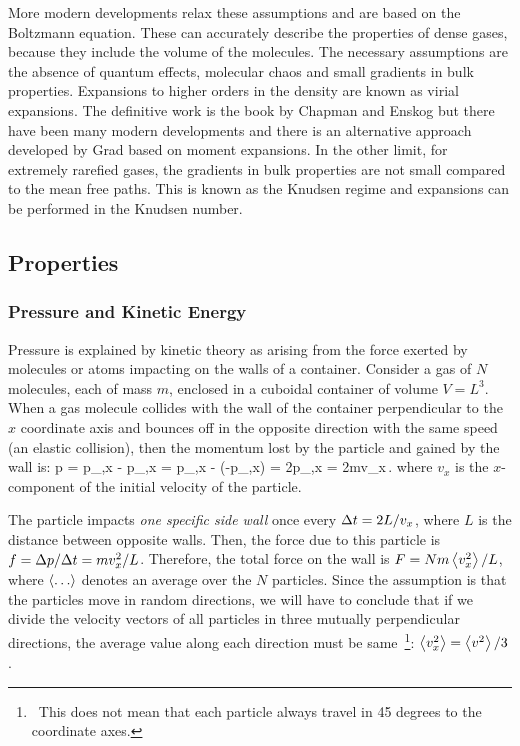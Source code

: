 More modern developments relax these assumptions and are based on the Boltzmann equation. These can accurately describe the properties of dense gases, because they include the volume of the molecules. The necessary assumptions are the absence of quantum effects, molecular chaos and small gradients in bulk properties. Expansions to higher orders in the density are known as virial expansions. The definitive work is the book by Chapman and Enskog but there have been many modern developments and there is an alternative approach developed by Grad based on moment expansions. In the other limit, for extremely rarefied gases, the gradients in bulk properties are not small compared to the mean free paths. This is known as the Knudsen regime and expansions can be performed in the Knudsen number.


\subsection{Properties}


\subsubsection{Pressure and Kinetic Energy}
Pressure is explained by kinetic theory as arising from the force exerted by molecules or atoms impacting on the walls of a container. Consider a gas of $N$ molecules, each of mass $m$, enclosed in a cuboidal container of volume $V = L^3$. When a gas molecule collides with the wall of the container perpendicular to the $x$ coordinate axis and bounces off in the opposite direction with the same speed (an elastic collision), then the momentum lost by the particle and gained by the wall is:
\beq
\diff p = p_{,x} - p_{,x} = p_{,x} - (-p_{,x}) = 2p_{,x} = 2mv_x\,.
\eeq
where $v_x$ is the $x$-component of the initial velocity of the particle. 

The particle impacts \emph{one specific side wall} once every $\Delta t = 2L/v_x$, where $L$ is the distance between opposite walls. Then, the force due to this particle is $f = \Delta p/\Delta t = mv_x^2/L$. Therefore, the total force on the wall is $F = Nm\left\langle{v_x^2}\right\rangle/L$, where $\left\langle{\dots}\right\rangle$ denotes an average over the $N$ particles. Since the assumption is that the particles move in random directions, we will have to conclude that if we divide the velocity vectors of all particles in three mutually perpendicular directions, the average value along each direction must be same~\footnote{~This does not mean that each particle always travel in 45 degrees to the coordinate axes.}: $\left\langle{v_x^2}\right\rangle = \left\langle{v^2}\right\rangle/3$. 

